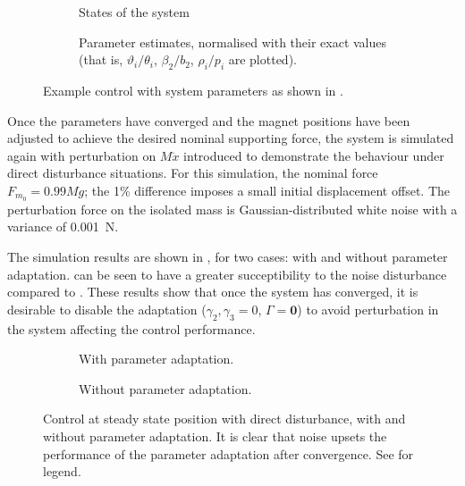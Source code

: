 \begin{figure}
  \centering
  \begin{subfigure}
    \caption{States of the system}
  \end{subfigure}
  \hfill
  \begin{subfigure}
    \caption{Parameter estimates, normalised with their exact values 
    (that is, $\vartheta_i/\theta_i$, $\beta_2/b_2$, $\rho_i/p_i$ are plotted).} 
  \end{subfigure}
  \caption{Example control with system parameters as shown in
    .}
\end{figure}

Once the parameters have converged and the magnet positions have been
adjusted to achieve the desired nominal supporting force, the system
is simulated again with perturbation on $M\ddot x$ introduced to
demonstrate the behaviour under direct disturbance situations. For
this simulation, the nominal force $F_{m_0}=0.99Mg$; the 1\%
difference imposes a small initial displacement offset. The
perturbation force on the isolated mass is Gaussian-distributed white
noise with a variance of \SI{0.001}{N}.

The simulation results are shown in , for two cases:
with and without parameter adaptation.  can be
seen to have a greater succeptibility to the noise disturbance
compared to . These results show that once the system has
converged, it is desirable to disable the adaptation
($\gamma_2,\gamma_3=0$, $\Gamma=\bm{0}$) to avoid perturbation in the
system affecting the control performance.

\begin{figure}
  \centering
  \begin{subfigure}
    \caption{With parameter adaptation.}
  \end{subfigure}
  \hfill
  \begin{subfigure}
    \caption{Without parameter adaptation.}
  \end{subfigure}
  \caption{Control at steady state position with direct disturbance,
    with and without parameter adaptation. It is clear that noise
    upsets the performance of the parameter adaptation after convergence.
    See  for legend.}
\end{figure}

